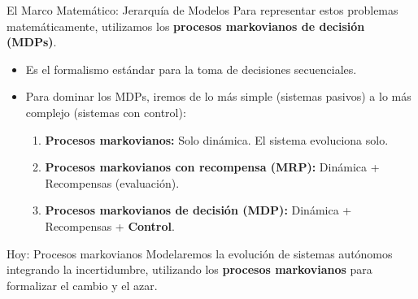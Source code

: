 \documentclass[xcolor=dvipsnames]{beamer}
\begin{document}
%

\begin{frame}{El Marco Matem\'atico: Jerarquía de Modelos}
Para representar estos problemas matemáticamente, utilizamos los \textbf{procesos markovianos de decisi\'on (MDPs)}.
\begin{itemize}
    \item Es el formalismo estándar para la toma de decisiones secuenciales.
\item Para dominar los MDPs, iremos de lo más simple (sistemas pasivos) a lo más complejo (sistemas con control):
\begin{enumerate}
    \item \textbf{Procesos markovianos:} Solo dinámica. El sistema evoluciona solo.
    \item \textbf{Procesos markovianos con recompensa (MRP):} Dinámica + Recompensas (evaluación).
    \item \textbf{Procesos markovianos de decisi\'on (MDP):} Dinámica + Recompensas + \textbf{Control}.
\end{enumerate}
\end{itemize}
\vspace{0.3cm}
\begin{block}{Hoy: Procesos markovianos}
Modelaremos la evolución de sistemas aut\'onomos integrando la incertidumbre, utilizando los \textbf{procesos markovianos} para formalizar el cambio y el azar.
\end{block}
\end{frame}
\end{document}
